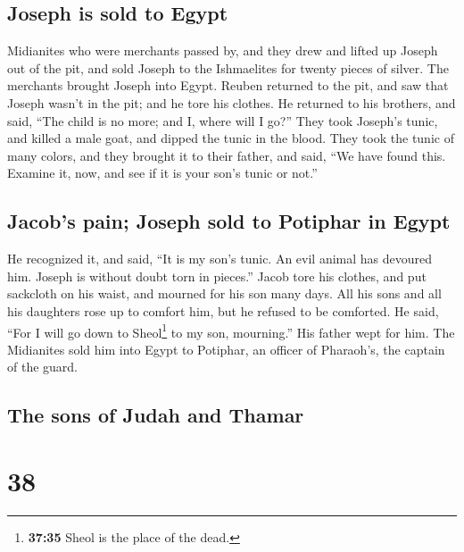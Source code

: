 \hypertarget{joseph-is-sold-to-egypt}{%
\subsection{Joseph is sold to Egypt}\label{joseph-is-sold-to-egypt}}

 Midianites who were merchants passed by, and they drew
and lifted up Joseph out of the pit, and sold Joseph to the Ishmaelites
for twenty pieces of silver. The merchants brought Joseph into Egypt.
 Reuben returned to the pit, and saw that Joseph wasn't
in the pit; and he tore his clothes.  He returned to his
brothers, and said, ``The child is no more; and I, where will I go?''
 They took Joseph's tunic, and killed a male goat, and
dipped the tunic in the blood.  They took the tunic of
many colors, and they brought it to their father, and said, ``We have
found this. Examine it, now, and see if it is your son's tunic or not.''

\hypertarget{jacobs-pain-joseph-sold-to-potiphar-in-egypt}{%
\subsection{Jacob's pain; Joseph sold to Potiphar in
Egypt}\label{jacobs-pain-joseph-sold-to-potiphar-in-egypt}}

 He recognized it, and said, ``It is my son's tunic. An
evil animal has devoured him. Joseph is without doubt torn in pieces.''
 Jacob tore his clothes, and put sackcloth on his waist,
and mourned for his son many days.  All his sons and all
his daughters rose up to comfort him, but he refused to be comforted. He
said, ``For I will go down to Sheol\footnote{\textbf{37:35} Sheol is the
  place of the dead.} to my son, mourning.'' His father wept for him.
 The Midianites sold him into Egypt to Potiphar, an
officer of Pharaoh's, the captain of the guard.

\hypertarget{the-sons-of-judah-and-thamar}{%
\subsection{The sons of Judah and
Thamar}\label{the-sons-of-judah-and-thamar}}

\hypertarget{section-37}{%
\section{38}\label{section-37}}

